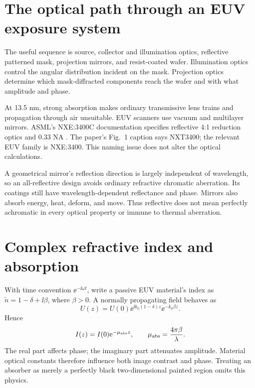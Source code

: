 \section{The optical path through an EUV exposure system}
The useful sequence is source, collector and illumination optics,
reflective patterned mask, projection mirrors, and resist-coated wafer.
Illumination optics control the angular distribution incident on the
mask. Projection optics determine which mask-diffracted components reach
the wafer and with what amplitude and phase.

At 13.5 nm, strong absorption makes ordinary transmissive lens trains
and propagation through air unsuitable. EUV scanners use vacuum and
multilayer mirrors. ASML's NXE:3400C documentation specifies reflective
4:1 reduction optics and 0.33 NA \cite{asml}.
The paper's Fig.~1 caption says NXT3400; the relevant EUV family is
NXE:3400. This naming issue does not alter the optical calculations.

A geometrical mirror's reflection direction is largely independent of
wavelength, so an all-reflective design avoids ordinary refractive
chromatic aberration. Its coatings still have wavelength-dependent
reflectance and phase. Mirrors also absorb energy, heat, deform, and move.
Thus reflective does not mean perfectly achromatic in every optical
property or immune to thermal aberration.

\section{Complex refractive index and absorption}
With time convention $\ee^{-\ii\omega t}$, write a passive EUV material's
index as $\widetilde n=1-\delta+\ii\beta$, where $\beta>0$.
A normally propagating field behaves as
\[
U(z)=U(0)\ee^{\ii k_0(1-\delta)z}\ee^{-k_0\beta z}.
\]
Hence
\begin{equation}
I(z)=I(0)\mathrm{e}^{-\mu_{\rm abs}z},\qquad
\mu_{\rm abs}=\frac{4\pi\beta}{\lambda}.
\end{equation}
The real part affects phase; the imaginary part attenuates amplitude.
Material optical constants therefore influence both image contrast and
phase. Treating an absorber as merely a perfectly black two-dimensional
painted region omits this physics.

